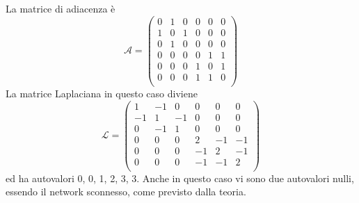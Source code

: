 La matrice di adiacenza \`e
\begin{equation}
    \mathcal{A}=\left(
    \begin{matrix}
        0 & 1 & 0 & 0 & 0 & 0\\
        1 & 0 & 1 & 0 & 0 & 0\\
        0 & 1 & 0 & 0 & 0 & 0\\
        0 & 0 & 0 & 0 & 1 & 1\\
        0 & 0 & 0 & 1 & 0 & 1\\
        0 & 0 & 0 & 1 & 1 & 0\\
    \end{matrix}\right)
\end{equation}
La matrice Laplaciana in questo caso diviene
\begin{equation}
    \mathcal{L}=\left(
    \begin{matrix}
        1 & -1 & 0 & 0 & 0 & 0\\
        -1 & 1 & -1 & 0 & 0 & 0\\
        0 & -1 & 1 & 0 & 0 & 0\\
        0 & 0 & 0 & 2 & -1 & -1\\
        0 & 0 & 0 & -1 & 2 & -1\\
        0 & 0 & 0 & -1 & -1 & 2\\
    \end{matrix}\right)
\end{equation}
ed ha autovalori 0, 0, 1, 2, 3, 3.
Anche in questo caso vi sono due autovalori nulli, essendo il network sconnesso, come previsto dalla teoria.